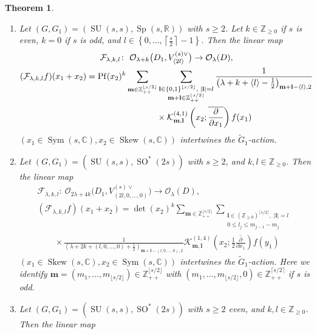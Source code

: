 \documentclass[pdftex]{sigma}
\numberwithin{equation}{section}
\newtheorem{Theorem}{Theorem}[section]
\newcommand{\bl}{\mathbf{l}}
\newcommand{\bm}{\mathbf{m}}
\newcommand{\BZ}{\mathbb{Z}}
\newcommand{\BR}{\mathbb{R}}
\newcommand{\BC}{\mathbb{C}}
\newcommand{\cF}{\mathcal{F}}
\newcommand{\cK}{\mathcal{K}}
\newcommand{\cO}{\mathcal{O}}
\newcommand{\Pf}{\operatorname{Pf}}
\newcommand{\Sym}{\operatorname{Sym}}
\newcommand{\Skew}{\operatorname{Skew}}
\begin{document}
\begin{Theorem}\label{main4}\quad
\begin{enumerate}\itemsep=0pt
\item[$(1)$] Let $(G,G_1)=(\operatorname{SU}(s,s), \operatorname{Sp}(s,\BR))$ with $s\ge 2$. Let $k\in\BZ_{\ge 0}$ if $s$ is even, $k=0$ if $s$ is odd,
and $l\in\left\{0,\ldots,\left\lceil\frac{s}{2}\right\rceil-1\right\}$. Then the linear map
\begin{gather*}
\cF_{\lambda,k,l}\colon \ \cO_{\lambda+k}\big(D_1,V_{\langle 2l\rangle}^{(s)\vee}\big)\to \cO_\lambda(D), \\
(\cF_{\lambda,k,l}f)(x_1+x_2) =\Pf(x_2)^k\sum_{\bm\in\BZ_{++}^{\lfloor s/2\rfloor}}
\sum_{\substack{\bl\in\{0,1\}^{\lfloor s/2\rfloor},\; |\bl|=l\\ \bm+\bl\in\BZ_{++}^{\lfloor s/2\rfloor}}}
\frac{1}{\left(\lambda+k+\langle l\rangle-\frac{1}{2}\right)_{\bm+\bl-\langle l\rangle,2}}\\
\hphantom{(\cF_{\lambda,k,l}f)(x_1+x_2) =}{} \times
\cK_{\bm,\bl}^{(4,1)}\left(x_2;\overline{\frac{\partial}{\partial x_1}}\right)f(x_1)
\end{gather*}
$(x_1\in\Sym(s,\BC), x_2\in\Skew(s,\BC))$ intertwines the $\tilde{G}_1$-action.
\item[$(2)$] Let $(G,G_1)=(\operatorname{SU}(s,s), \operatorname{SO}^*(2s))$ with $s\ge 2$, and $k,l\in\BZ_{\ge 0}$. Then the linear map
\begin{gather*}
\cF_{\lambda,k,l}\colon \ \cO_{2\lambda+4k}\big(D_1,V_{(2l,0,\ldots,0)}^{(s)\vee}\big)\to \cO_\lambda(D), \\
(\cF_{\lambda,k,l}f)(x_1+x_2)=\det(x_2)^k\sum_{\bm\in\BZ_{++}^{\lfloor s/2\rfloor}}
\sum_{\substack{\bl\in(\BZ_{\ge 0})^{\lceil s/2\rceil},\; |\bl|=l\\ 0\le l_j\le m_{j-1}-m_j}}\\
\qquad{} \times\frac{1}{\left(\lambda+2k+(l,0,\ldots,0)+\frac{1}{2}\right)_{\bm+\bl-(l,0,\ldots,0),2}}
\cK_{\bm,\bl}^{(1,4)}\left(x_2;\frac{1}{2}\overline{\frac{\partial}{\partial x_1}}\right)f(y_1)
\end{gather*}
$(x_1\in\Skew(s,\BC), x_2\in\Sym(s,\BC))$ intertwines the $\tilde{G}_1$-action. Here we identify $\bm=(m_1,\ldots,m_{\lfloor s/2\rfloor})\in\BZ_{++}^{\lfloor s/2\rfloor}$ with
$(m_1,\ldots,m_{\lfloor s/2\rfloor},0)\in\BZ_{++}^{\lceil s/2\rceil}$ if $s$ is odd.
\item[$(3)$] Let $(G,G_1)=(\operatorname{SU}(s,s), \operatorname{SO}^*(2s))$ with $s\ge 2$ even, and $k,l\in\BZ_{\ge 0}$. Then the linear map

\end{enumerate}
\end{Theorem}
\end{document}

